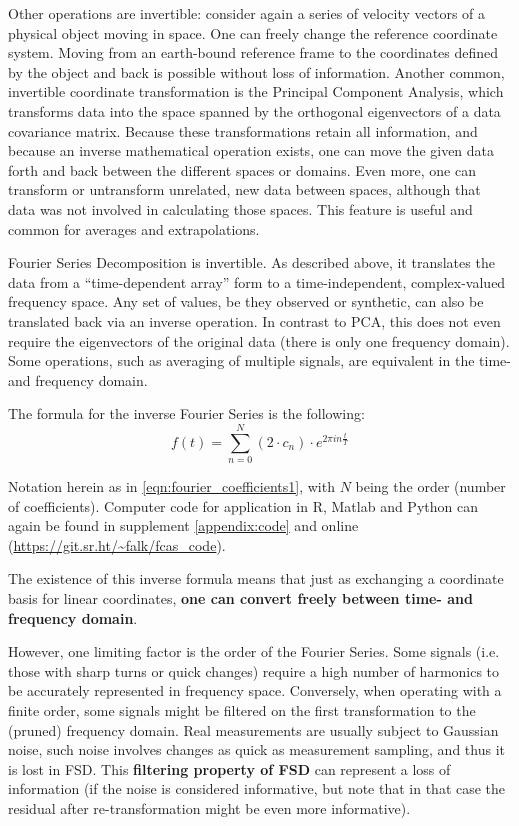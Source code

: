 Other operations are invertible: consider again a series of velocity vectors of a physical object moving in space.
One can freely change the reference coordinate system.
Moving from an earth-bound reference frame to the coordinates defined by the object and back is possible without loss of information.
Another common, invertible coordinate transformation is the Principal Component Analysis, which transforms data into the space spanned by the orthogonal eigenvectors of a data covariance matrix.
Because these transformations retain all information, and because an inverse mathematical operation exists, one can move the given data forth and back between the different spaces or domains.
Even more, one can transform or untransform unrelated, new data between spaces, although that data was not involved in calculating those spaces.
This feature is useful and common for averages and extrapolations.


Fourier Series Decomposition is invertible.
As described above, it translates the data from a ``time-dependent array'' form to a time-independent, complex-valued frequency space.
Any set of values, be they observed or synthetic, can also be translated back via an inverse operation.
In contrast to PCA, this does not even require the eigenvectors of the original data (there is only one frequency domain).
Some operations, such as averaging of multiple signals, are equivalent in the time- and frequency domain.

The formula for the inverse Fourier Series is the following:
\begin{equation}\label{eqn:fourier_inversion}
	f(t) = \sum\limits_{n=0}^{N} (2\cdot c_{n})\cdot e^{2\pi i n \frac{t}{T}}
\end{equation}

Notation herein as in \eqref{eqn:fourier_coefficients1}, with \(N\) being the order (number of coefficients).
Computer code for application in R, Matlab and Python can again be found in supplement \ref{appendix:code} and online (\url{https://git.sr.ht/~falk/fcas_code}).

The existence of this inverse formula means that just as exchanging a coordinate basis for linear coordinates, \textbf{one can convert freely between time- and frequency domain}.


However, one limiting factor is the order of the Fourier Series.
Some signals (i.e. those with sharp turns or quick changes) require a high number of harmonics to be accurately represented in frequency space.
Conversely, when operating with a finite order, some signals might be filtered on the first transformation to the (pruned) frequency domain.
Real measurements are usually subject to Gaussian noise, such noise involves changes as quick as measurement sampling, and thus it is lost in FSD.
This \textbf{filtering property of FSD} can represent a loss of information (if the noise is considered informative, but note that in that case the residual after re-transformation might be even more informative).

